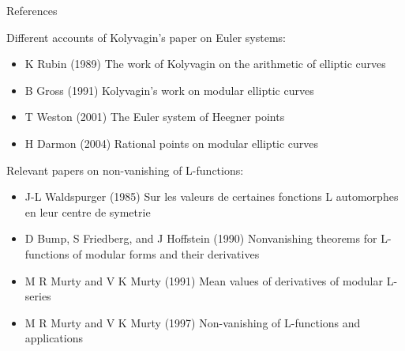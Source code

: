 \documentclass[10pt]{beamer}
\begin{document}
\begin{frame}[t]{References}

Different accounts of Kolyvagin's paper on Euler systems:
\begin{itemize}
\item K Rubin (1989) The work of Kolyvagin on the arithmetic of elliptic curves
\item B Gross (1991) Kolyvagin's work on modular elliptic curves
\item T Weston (2001) The Euler system of Heegner points
\item H Darmon (2004) Rational points on modular elliptic curves
\end{itemize}
Relevant papers on non-vanishing of L-functions:
\begin{itemize}
\item J-L Waldspurger (1985) Sur les valeurs de certaines fonctions L automorphes en leur centre de symetrie
\item D Bump, S Friedberg, and J Hoffstein (1990) Nonvanishing theorems for L-functions of modular forms
and their derivatives
\item M R Murty and V K Murty (1991) Mean values of derivatives of modular L-series
\item M R Murty and V K Murty (1997) Non-vanishing of L-functions and applications
\end{itemize}

\end{frame}
\end{document}
